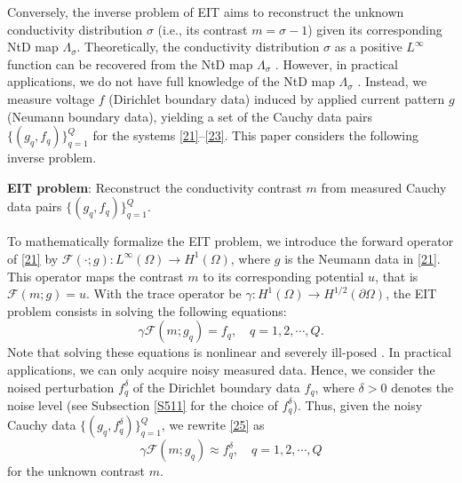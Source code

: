 \documentclass[11pt]{article}
\newcommand{\pa}{\partial}
\begin{document}
Conversely, the inverse problem of EIT aims to reconstruct the unknown conductivity distribution $ \sigma $ (i.e., its contrast $ m=\sigma-1 $) given its corresponding NtD map $ \Lambda_\sigma $.
Theoretically, the conductivity distribution $\sigma$ as a positive $ L^\infty $ function can be recovered from the NtD map $ \Lambda_\sigma $ \cite{AKP06}.
However, in practical applications, we do not have full knowledge of the NtD map $ \Lambda_\sigma $ \cite{BL02}. 
Instead, we measure voltage $ f $ (Dirichlet boundary data) induced by applied current pattern $g$ (Neumann boundary data), yielding a set of the Cauchy data pairs $ \{(g_q, f_q)\}_{q=1}^Q $ for the systems \eqref{21}--\eqref{23}.
This paper considers the following inverse problem.

\textbf{EIT problem}: Reconstruct the conductivity contrast $m$ from measured Cauchy data pairs $ \{(g_q, f_q)\}_{q=1}^Q $.

To mathematically formalize the EIT problem, we introduce the forward operator of \eqref{21} by $\mathcal{F}(\cdot; g):
L^\infty(\Omega)\to H^1(\Omega)$, where $ g $ is the Neumann data in \eqref{21}. 
This operator maps the contrast $ m $ to its corresponding potential $ u $, that is $ \mathcal{F}(m; g) = u $.
With the trace operator be $\gamma: H^1(\Omega)\to H^{1/2}(\pa\Omega) $, the EIT problem consists in solving the following equations:
\begin{equation}\label{25}
\gamma\mathcal{F}(m; g_q) = f_q,\quad q=1,2,\cdots,Q.
\end{equation}
Note that solving these equations is nonlinear and severely ill-posed \cite{BL02}.
In practical applications, we can only acquire noisy measured data. 
Hence, we consider the noised perturbation $ f^\delta_q $ of the Dirichlet boundary data $ f_q $, where $\delta>0$ denotes the noise level (see Subsection \ref{S511} for the choice of $ f^\delta_q $). 
Thus, given the noisy Cauchy data $ \{(g_q, f^\delta_q)\}_{q=1}^Q $, we rewrite \eqref{25} as
\begin{equation}\label{26}
\gamma\mathcal{F}(m; g_q) \approx f^\delta_q,\quad q=1,2,\cdots,Q
\end{equation}
for the unknown contrast $m$.
\end{document}
